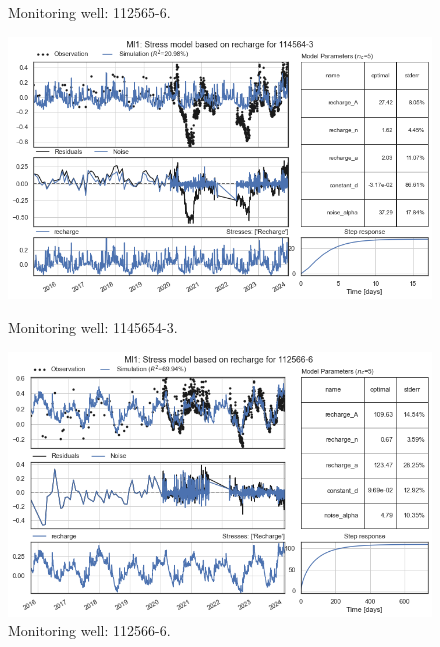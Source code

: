 \begin{figure}[htbp]
\begin{minipage}{0.32\textwidth}
        \caption{Monitoring well: 112565-6.}
        \label{fig:112565-3}
    \end{minipage}
\end{figure}
\begin{figure}[htbp]
    \centering
    \begin{minipage}{0.32\textwidth}
        \centering
        \includegraphics[width=\linewidth]{frontmatter/Rozenburg-fig/25.png}
        \caption{Monitoring well: 1145654-3.}
        \label{fig:112565-3}
    \end{minipage}
    \hfill
    \begin{minipage}{0.32\textwidth}
        \centering
        \includegraphics[width=\linewidth]{frontmatter/Rozenburg-fig/26.png}
        \caption{Monitoring well: 112566-6.}
        \label{fig:112565-3}
    \end{minipage}
    \hfill
    \begin{minipage}{0.32\textwidth}

\end{minipage}
\end{figure}
